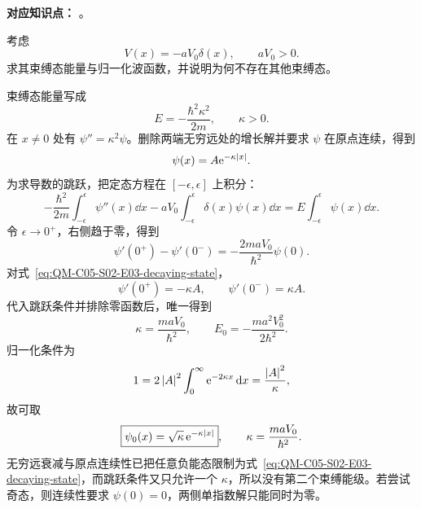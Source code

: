 
\textbf{对应知识点：}
。

考虑
\begin{equation}
  V(x)=-aV_0\delta(x),
  \qquad aV_0>0.
  \label{eq:QM-C05-S02-E03-potential}
\end{equation}
求其束缚态能量与归一化波函数，并说明为何不存在其他束缚态。

\begin{checkedsolution}
束缚态能量写成
\begin{equation}
  E=-\frac{\hbar^2\kappa^2}{2m},
  \qquad\kappa>0.
  \label{eq:QM-C05-S02-E03-negative-energy}
\end{equation}
在 $x\neq0$ 处有 $\psi''=\kappa^2\psi$。删除两端无穷远处的增长解并要求 $\psi$ 在原点连续，得到
\begin{equation}
  \psi(x)=A\mathrm{e}^{-\kappa\left|x\right|}.
  \label{eq:QM-C05-S02-E03-decaying-state}
\end{equation}
为求导数的跳跃，把定态方程在 $[-\epsilon,\epsilon]$ 上积分：
\begin{equation}
  -\frac{\hbar^2}{2m}
  \int_{-\epsilon}^{\epsilon}\psi''(x)\dd x
  -aV_0\int_{-\epsilon}^{\epsilon}
  \delta(x)\psi(x)\dd x
  =E\int_{-\epsilon}^{\epsilon}\psi(x)\dd x.
  \label{eq:QM-C05-S02-E03-integrated-equation}
\end{equation}
令 $\epsilon\to0^+$，右侧趋于零，得到
\begin{equation}
  \boxed{
  \psi'(0^+)-\psi'(0^-)
  =-\frac{2maV_0}{\hbar^2}\psi(0)}.
  \label{eq:QM-C05-S02-E03-jump-condition}
\end{equation}
对式~\eqref{eq:QM-C05-S02-E03-decaying-state}，
\begin{equation}
  \psi'(0^+)=-\kappa A,
  \qquad
  \psi'(0^-)=\kappa A.
  \label{eq:QM-C05-S02-E03-one-sided-derivatives}
\end{equation}
代入跳跃条件并排除零函数后，唯一得到
\begin{equation}
  \kappa=\frac{maV_0}{\hbar^2},
  \qquad
  \boxed{E_0=-\frac{ma^2V_0^2}{2\hbar^2}}.
  \label{eq:QM-C05-S02-E03-energy}
\end{equation}
归一化条件为
\begin{equation}
  1=2\left|A\right|^2\int_0^\infty\mathrm{e}^{-2\kappa x}\mathop{}\!\mathrm{d} x
  =\frac{\left|A\right|^2}{\kappa},
  \label{eq:QM-C05-S02-E03-normalization}
\end{equation}
故可取
\begin{equation}
  \boxed{
  \psi_0(x)=\sqrt\kappa\,\mathrm{e}^{-\kappa\left|x\right|}},
  \qquad
  \kappa=\frac{maV_0}{\hbar^2}.
  \label{eq:QM-C05-S02-E03-normalized-state}
\end{equation}
无穷远衰减与原点连续性已把任意负能态限制为式~\eqref{eq:QM-C05-S02-E03-decaying-state}，而跳跃条件又只允许一个 $\kappa$，所以没有第二个束缚能级。若尝试奇态，则连续性要求 $\psi(0)=0$，两侧单指数解只能同时为零。
\end{checkedsolution}

